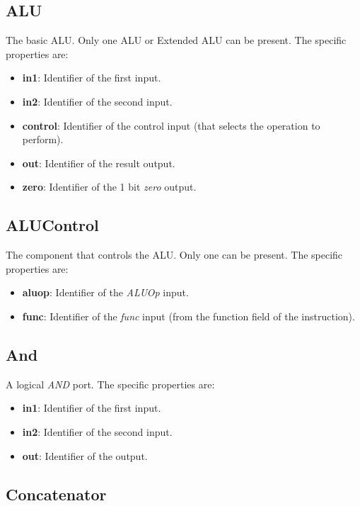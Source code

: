 \documentclass[11pt,a4paper,twoside,titlepage]{report}
\begin{document}
\subsection{ALU}

The basic ALU. Only one ALU or Extended ALU can be present. The specific properties are:
\begin{itemize}
	\item \textbf{in1}: Identifier of the first input.
	\item \textbf{in2}: Identifier of the second input.
	\item \textbf{control}: Identifier of the control input (that selects the operation
		to perform).
	\item \textbf{out}: Identifier of the result output.
	\item \textbf{zero}: Identifier of the 1 bit \emph{zero} output.
\end{itemize}

\subsection{ALUControl}

The component that controls the ALU. Only one can be present.
The specific properties are:
\begin{itemize}
	\item \textbf{aluop}: Identifier of the \emph{ALUOp} input.
	\item \textbf{func}: Identifier of the \emph{func} input (from the function field
		of the instruction).
\end{itemize}

\subsection{And}

A logical \emph{AND} port. The specific properties are:
\begin{itemize}
	\item \textbf{in1}: Identifier of the first input.
	\item \textbf{in2}: Identifier of the second input.
	\item \textbf{out}: Identifier of the output.
\end{itemize}

\subsection{Concatenator}
\end{document}
